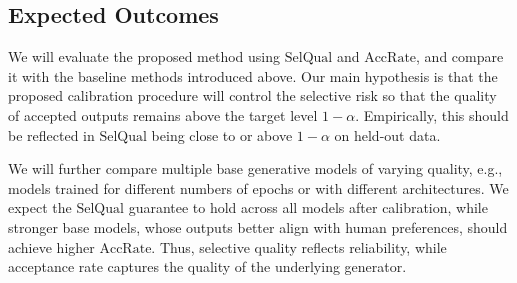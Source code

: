 \documentclass[twocolumn,11pt]{article}
\theoremstyle{plain}
\theoremstyle{definition}
\theoremstyle{remark}
\newtheorem{remark}[theorem]{Remark}
\newenvironment{minxing}
{\par\begingroup\color{brown}\noindent\textbf{[Minxing]: }\ignorespaces}
  {\par\endgroup}
\newcommand{\mx}[1]{\textcolor{brown}{[Minxing]: #1}}
\begin{document}
\subsection{Expected Outcomes}

We will evaluate the proposed method using \(\mathrm{SelQual}\) and \(\mathrm{AccRate}\), and compare it with the baseline methods introduced above. Our main hypothesis is that the proposed calibration procedure will control the selective risk so that the quality of accepted outputs remains above the target level \(1-\alpha\). Empirically, this should be reflected in \(\mathrm{SelQual}\) being close to or above \(1-\alpha\) on held-out data.

We will further compare multiple base generative models of varying quality, e.g., models trained for different numbers of epochs or with different architectures. We expect the $\mathrm{SelQual}$ guarantee to hold across all models after calibration, while stronger base models, whose outputs better align with human preferences, should achieve higher \(\mathrm{AccRate}\). Thus, selective quality reflects reliability, while acceptance rate captures the quality of the underlying generator.


\end{document}
